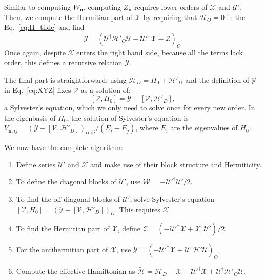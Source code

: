 %
Similar to computing $W_{\mathbf{n}}$, computing $Z_{\mathbf{n}}$ requires lower-orders of $\mathcal{X}$ and $\mathcal{U}'$.
Then, we compute the Hermitian part of $\mathcal{X}$ by requiring that $\tilde{\mathcal{H}}_{O} = 0$ in the Eq.~\eqref{eq:H_tilde} and find
%
\begin{equation}
\label{eq:Y}
\mathcal{Y} = (\mathcal{U}^\dagger \mathcal{H}'_{O} \mathcal{U} -
\mathcal{U}'^\dagger \mathcal{X} - \mathcal{Z})_{O}.
\end{equation}
%
Once again, despite $\mathcal{X}$ enters the right hand side, because all the terms lack  order, this defines a recursive relation $\mathcal{Y}$.

The final part is straightforward: using $\mathcal{H}_{D} = H_0 + \mathcal{H}'_{D}$ and the definition of $\mathcal{Y}$ in Eq.~\eqref{eq:XYZ} fixes $\mathcal{V}$ as a solution of:
%
\begin{equation}
\label{eq:sylvester}
[\mathcal{V}, H_0] = \mathcal{Y} - [\mathcal{V}, \mathcal{H}'_{D}],
\end{equation}
%
a Sylvester's equation, which we only need to solve once for every new order.
In the eigenbasis of $H_0$, the solution of Sylvester's equation is $V_{\mathbf{n}, ij} = (\mathcal{Y} - [\mathcal{V}, \mathcal{H}'_{D}])_{\mathbf{n}, ij}/(E_i - E_j)$, where $E_i$ are the eigenvalues of $H_0$.

We now have the complete algorithm:
%
\begin{enumerate}
    \item Define series $\mathcal{U}'$ and $\mathcal{X}$ and make use of their block structure and Hermiticity.
    \item To define the diagonal blocks of $\mathcal{U}'$, use $\mathcal{W} = -\mathcal{U}'^\dagger\mathcal{U}'/2$.
    \item To find the off-diagonal blocks of $\mathcal{U}'$, solve Sylvester's equation \\ $[\mathcal{V}, H_0] = (\mathcal{Y} - [\mathcal{V}, \mathcal{H}'_{D}])_{O}$.
      This requires $\mathcal{X}$.
    \item To find the Hermitian part of $\mathcal{X}$, define $\mathcal{Z} = (-\mathcal{U}'^\dagger\mathcal{X} + \mathcal{X}^\dagger\mathcal{U}')/2$.
    \item For the antihermitian part of $\mathcal{X}$, use $\mathcal{Y} = (-\mathcal{U}'^\dagger\mathcal{X} + \mathcal{U}^\dagger\mathcal{H}'\mathcal{U})_{O}$.
    \item  Compute the effective Hamiltonian as $\tilde{\mathcal{H}} = \mathcal{H}_{D} - \mathcal{X} - \mathcal{U}'^\dagger \mathcal{X} + \mathcal{U}^\dagger\mathcal{H}'_{O}\mathcal{U}$.
\end{enumerate}

